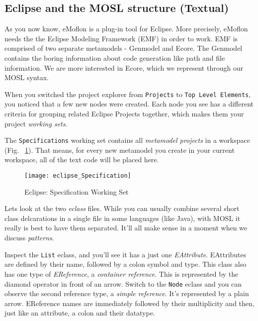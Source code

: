\newpage
\texHeader

\subsection{Eclipse and the MOSL structure (Textual)}

As\hypertarget{projectStructure tex}{} you now know, eMoflon is a plug-in tool for Eclipse. More precisely, eMoflon needs the the Eclipse Modeling Framework (EMF) in order to work. EMF is comprised of two separate metamodels - Genmodel and Ecore. The Genmodel contains the boring information about code generation like path and file information. 
We are more interested in Ecore, which we represent through our MOSL syntax. 

When you switched the project explorer from \texttt{Projects} to \texttt{Top Level Elements}, you noticed that a few new nodes were created. Each node you see has a different criteria for grouping related Eclipse Projects together, which makes them your project \emph{working sets}. 

The \texttt{Specifications} working set contains all \emph{metamodel projects} in a workspace (Fig. ~\ref{fig_modelSpecification}). That means, for every new metamodel you create in your current workspace, all of the text code will be placed here.

 \begin{figure}[htbp]
  \centering
  \texttt{[image: eclipse\_Specification]}
  \caption{Eclipse: Specification Working Set}
  \label{fig_modelSpecification}
\end{figure}
  

Lets look at the two \emph{eclass} files. While you can usually combine several short class delcarations in a single file in some languages (like Java), with MOSL it really is best to have them separated. It'll all make sense in a moment when we discuss \emph{patterns}.

Inspect the \texttt{List} eclass, and you'll see it has a just one \emph{EAttribute}. EAttributes are defined by their name, followed by a colon symbol and type. This class also has one type of \emph{EReference}, a \emph{container reference}. This is represented by the diamond operator in front of an arrow. Switch to the \texttt{Node} eclass and you can observe the second reference type, a \emph{simple reference}. It's represented by a plain arrow. EReference names are immediately followed by their multiplicity and then, just like an attribute, a colon and their datatype.

